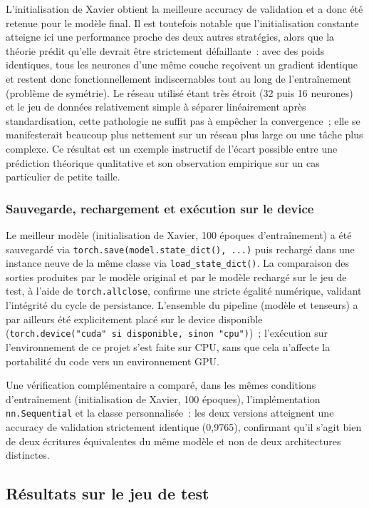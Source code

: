\documentclass[11pt,a4paper]{article}
\begin{document}
L'initialisation de Xavier obtient la meilleure accuracy de validation et a donc été retenue pour le modèle final. Il est toutefois notable que l'initialisation constante atteigne ici une performance proche des deux autres stratégies, alors que la théorie prédit qu'elle devrait être strictement défaillante~: avec des poids identiques, tous les neurones d'une même couche reçoivent un gradient identique et restent donc fonctionnellement indiscernables tout au long de l'entraînement (problème de symétrie). Le réseau utilisé étant très étroit (32 puis 16 neurones) et le jeu de données relativement simple à séparer linéairement après standardisation, cette pathologie ne suffit pas à empêcher la convergence~; elle se manifesterait beaucoup plus nettement sur un réseau plus large ou une tâche plus complexe. Ce résultat est un exemple instructif de l'écart possible entre une prédiction théorique qualitative et son observation empirique sur un cas particulier de petite taille.

\subsubsection{Sauvegarde, rechargement et exécution sur le device}

Le meilleur modèle (initialisation de Xavier, 100 époques d'entraînement) a été sauvegardé via \texttt{torch.save(model.state\_dict(), ...)} puis rechargé dans une instance neuve de la même classe via \texttt{load\_state\_dict()}. La comparaison des sorties produites par le modèle original et par le modèle rechargé sur le jeu de test, à l'aide de \texttt{torch.allclose}, confirme une stricte égalité numérique, validant l'intégrité du cycle de persistance. L'ensemble du pipeline (modèle et tenseurs) a par ailleurs été explicitement placé sur le device disponible (\texttt{torch.device("cuda" si disponible, sinon "cpu")})~; l'exécution sur l'environnement de ce projet s'est faite sur CPU, sans que cela n'affecte la portabilité du code vers un environnement GPU.

Une vérification complémentaire a comparé, dans les mêmes conditions d'entraînement (initialisation de Xavier, 100 époques), l'implémentation \texttt{nn.Sequential} et la classe personnalisée~: les deux versions atteignent une accuracy de validation strictement identique (0,9765), confirmant qu'il s'agit bien de deux écritures équivalentes du même modèle et non de deux architectures distinctes.

\subsection{Résultats sur le jeu de test}
\end{document}

